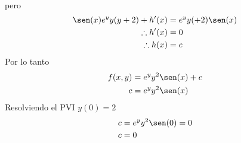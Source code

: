 \begin{enumerate}
\begin{enumerate}
\begin{align*}
\end{align*}
pero
\begin{align*}
    \sen(x)e^{y}y(y+2)+h'(x) &=e^{y}y(+2)\sen(x)\\
    \therefore h'(x)&=0\\
    \therefore h (x)& =c
\end{align*}
Por lo tanto 
\begin{align*}
    f(x,y) &= e^{y}y^{2}\sen(x)+c\\
    c &= e^{y}y^{2}\sen(x)
\end{align*}
Resolviendo el PVI $y(0)=2$
\begin{align*}
    c & = e^{y}y^{2}\sen(0)=0 \\
    c & = 0
\end{align*}
\end{enumerate}
\end{enumerate}